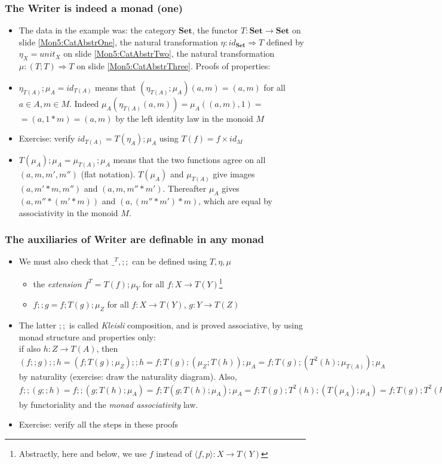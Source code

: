\documentclass[handout]{beamer}
\newcommand{\To}{\Rightarrow}
\newcommand{\bfsf}[1]{{\boldsymbol{#1}}}
\newcommand{\Set}{\bfsf{Set}}
\newcommand{\Kp}[1]{{\langle #1 \rangle}}
\newcommand{\Kc}{;\!;}
\begin{document}
\frame
  {   
    \frametitle{The Writer is indeed a monad (one)}\label{Mon5:ExaMonad}

 \begin{itemize}[<+->]
\item The data in the example was: the category $\Set$, 
the functor $T:\Set\to\Set$ on slide \ref{Mon5:CatAbstrOne}, 
the natural transformation $\eta: id_\Set\To T$
defined by $\eta_X = unit_X$ on slide \ref{Mon5:CatAbstrTwo}, 
the natural transformation $\mu: (T;T) \To T$
on slide \ref{Mon5:CatAbstrThree}. Proofs of properties:
\item $\eta_{T(A)};\mu_A = id_{T(A)}$ means that  $(\eta_{T(A)};\mu_A)(a,m) = (a,m)$
for all $a\in A, m\in M$. Indeed $\mu_A(\eta_{T(A)}(a,m)) = \mu_A((a,m),1) =$ $= (a,1*m) = (a,m)$
by the left identity law in the monoid $M$
\item Exercise: verify  $id_{T(A)} = T(\eta_A);\mu_A$ using $T(f) = f\times id_M$
\item $T(\mu_A);\mu_A = \mu_{T(A)};\mu_A$ means that the two functions agree
on all $(a,m,m',m'')$ (flat notation). $T(\mu_A)$ and $\mu_{T(A)}$ give images $(a,m'*m,m'')$ and $(a,m,m''*m')$. Thereafter $\mu_A$ gives $(a,m''*(m'*m))$ and $(a,(m''*m')*m)$, which are equal by associativity in the monoid $M$.
 \end{itemize}

 }

\frame
  {   
    \frametitle{The auxiliaries of Writer are definable in any monad}\label{Mon5:ExaMonadAux}

 \begin{itemize}[<+->]
\item We must also check that $\_^T, \Kc$ can be defined using $T,\eta,\mu$
 \begin{itemize}
\item the \emph{extension} $f^T = T(f);\mu_Y$ for all $f: X\to T(Y)$\footnote{Abstractly, here and below,
we use $f$ instead of $\Kp{f,p}:X\to T(Y)$}
\item $f \Kc  g = f ;T(g);\mu_Z$ for all $f: X\to T(Y)$, $g: Y\to T(Z)$
 \end{itemize}
\item The latter $\Kc$ is called \emph{Kleisli} composition, and is proved
associative, by using monad structure and properties only:\\
if also $h: Z\to T(A)$, then
$(f \Kc g) \Kc h = (f ;T(g);\mu_Z) \Kc h = f ;T(g);(\mu_Z; T(h)) ; \mu_A =
f ;T(g);(T^2(h);\mu_{T(A)}) ; \mu_A$ by naturality (exercise: draw the naturality diagram). 
Also, $f \Kc (g \Kc h) = f \Kc (g;T(h);\mu_A) = f; T(g;T(h);\mu_A);\mu_A =
f; T(g);T^2(h);(T(\mu_A);\mu_A) = f; T(g);T^2(h);(\mu_{T(A)};\mu_A)$
by functoriality and the \emph{monad associativity} law.

\item Exercise: verify all the steps in these proofs
 \end{itemize}

 }
\end{document}

